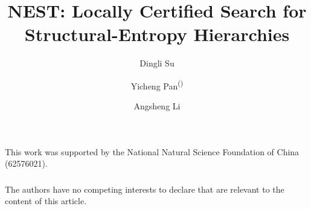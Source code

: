 \documentclass[runningheads,a4paper]{llncs}
\begin{document}
\title{NEST: Locally Certified Search for\\
Structural-Entropy Hierarchies}
\author{Dingli Su\and
Yicheng Pan\textsuperscript{(\Letter)}\and
Angsheng Li}
\maketitle









\appendix


\begin{credits}
\subsubsection{\ackname} This work was supported by the National Natural
Science Foundation of China (62576021).

\subsubsection{\discintname}
The authors have no competing interests to declare that are relevant to the
content of this article.
\end{credits}



\end{document}
